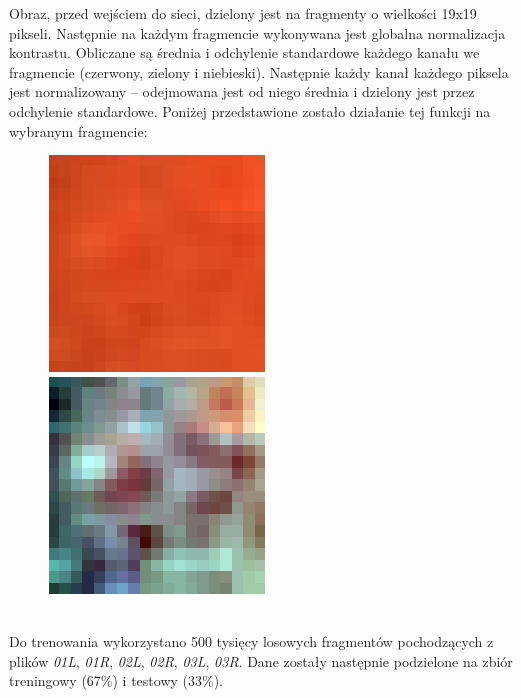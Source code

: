 \documentclass[polish,polish,a4paper]{article}
\begin{document}
			Obraz, przed wejściem do sieci, dzielony jest na fragmenty o wielkości 19x19 pikseli.
Następnie na każdym fragmencie wykonywana jest globalna normalizacja kontrastu.
Obliczane są średnia i odchylenie standardowe każdego kanału we fragmencie (czerwony, zielony i niebieski).
Następnie każdy kanał każdego piksela jest normalizowany -- odejmowana
jest od niego średnia i dzielony jest przez odchylenie standardowe.
Poniżej przedstawione zostało działanie tej funkcji na wybranym fragmencie:
\begin{figure}[!h]
	\centering
	\begin{minipage}{0.3\linewidth}
		\includegraphics[scale=0.5]{./dane/preprocess.png}
	\end{minipage}
	\begin{minipage}{0.3\linewidth}
		\includegraphics[scale=0.5]{./dane/postprocess.png}
	\end{minipage}
\end{figure}
\\ Do trenowania wykorzystano 500 tysięcy losowych fragmentów pochodzących z plików \textit{01L}, \textit{01R}, \textit{02L}, \textit{02R}, \textit{03L}, \textit{03R}. Dane zostały następnie podzielone na zbiór treningowy (67\%) i testowy (33\%).
\end{document}
